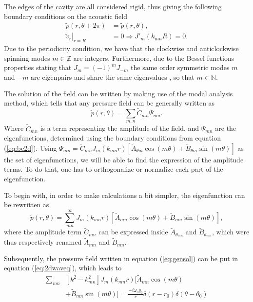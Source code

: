 \documentclass[%
 reprint,
 amsmath,amssymb,
 aps,
]{revtex4-2}
\begin{document}
The edges of the cavity are all considered rigid, thus giving the following boundary conditions on the acoustic field
\begin{equation}
   \begin{split}
       \tilde{p}(r, \theta + 2 \pi) &= \tilde{p}(r, \theta),\\
               \left. \tilde{v}_r \right|_{r=R} & = 0 \Rightarrow J'_m (k_{mn}R) = 0.
   \end{split} \label{eq:bc2d}
\end{equation}
Due to the periodicity condition, we have that the clockwise and anticlockwise spinning modes $m \in \mathbb{Z}$ are integers. Furthermore, due to the Bessel functions properties stating that $J_m = (-1)^m J_{-m}$ the same order symmetric modes $m$ and $-m$ are eigenpairs and share the same eigenvalues \cite{rona2007}, so that $m \in \mathbb{N}$.

The solution of the field can be written by making use of the modal analysis method, which tells that any pressure field can be generally written as 
\begin{equation}
    \tilde{p}(r, \theta) = \sum_{m,n} \tilde{C}_{mn} \Psi_{mn}.
\end{equation}
Where $\tilde{C}_{mn}$ is a term representing the amplitude of the field, and $\Psi_{mn}$ are the eigenfunctions, determined using the boundary conditions from equation (\ref{eq:bc2d}). Using $\Psi_{mn} = \tilde{C}_{mn} J_m (k_{mn}r)\left[ \tilde{A}_{\theta m} \cos(m \theta) + \tilde{B}_{\theta m} \sin(m \theta) \right]$ as the set of eigenfunctions, we will be able to find the expression of the amplitude terms. To do that, one has to orthogonalize or normalize each part of the eigenfunction.

To begin with, in order to make calculations a bit simpler, the eigenfunction can be rewritten as
\begin{equation}
        \tilde{p}(r, \theta) = \sum_{mn}^{\infty} J_m(k_{mn}r) \left[ \tilde{A}_{mn} \cos(m \theta) + \tilde{B}_{mn} \sin(m \theta) \right], \label{eq:gensol}
\end{equation}
where the amplitude term $\tilde{C}_{mn}$ can be expressed inside $\tilde{A}_{\theta_{mn}}$ and $\tilde{B}_{\theta_{mn}}$, which were thus respectively renamed $\tilde{A}_{mn}$ and $\tilde{B}_{mn}$.

Subsequently, the pressure field written in equation (\ref{eq:gensol}) can be put in equation (\ref{eq:2dwaveq}), which leads to
\begin{equation}
    \begin{split}
        \sum_{mn} &\left[ k^2 - k_{mn}^2 \right] J_m(k_{mn}r) \Big[ \tilde{A}_{mn} \cos(m\theta) \\&+ \tilde{B}_{mn} \sin(m\theta) \Big]= \frac{- i \omega_0 q_0 }{r} \delta(r - r_0) \delta(\theta - \theta_0)
    \end{split} \label{eq:rawsol}
\end{equation}
\end{document}
